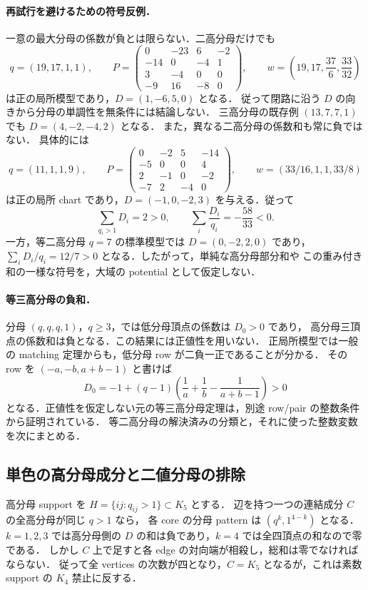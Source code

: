 \paragraph{再試行を避けるための符号反例．}
一意の最大分母の係数が負とは限らない．二高分母だけでも
\[
 q=(19,17,1,1),\qquad
 P=\begin{pmatrix}
 0&-23&6&-2\\-14&0&-4&1\\3&-4&0&0\\-9&16&-8&0
 \end{pmatrix},\qquad
 w=\left(19,17,\frac{37}{6},\frac{33}{32}\right)
\]
は正の局所模型であり，$D=(1,-6,5,0)$ となる．
従って閉路に沿う $D$ の向きから分母の単調性を無条件には結論しない．
三高分母の既存例 $(13,7,7,1)$ でも $D=(4,-2,-4,2)$ となる．
また，異なる二高分母の係数和も常に負ではない．
具体的には
\[
 q=(11,1,1,9),\qquad
 P=\begin{pmatrix}
 0&-2&5&-14\\
 -5&0&0&4\\
 2&-1&0&-2\\
 -7&2&-4&0
 \end{pmatrix},\qquad
 w=(33/16,1,1,33/8)
\]
は正の局所 chart であり，$D=(-1,0,-2,3)$ を与える．従って
\[
 \sum_{q_i>1}D_i=2>0,\qquad
 \sum_i\frac{D_i}{q_i}=-\frac{58}{33}<0.
\]
一方，等二高分母 $q=7$ の標準模型では $D=(0,-2,2,0)$ であり，
$\sum_iD_i/q_i=12/7>0$ となる．したがって，単純な高分母部分和や
この重み付き和の一様な符号を，大域の potential として仮定しない．

\paragraph{等三高分母の負和．}
分母 $(q,q,q,1)$，$q\geq3$，では低分母頂点の係数は $D_0>0$ であり，
高分母三頂点の係数和は負となる．この結果には正値性を用いない．
正局所模型では一般の matching 定理からも，低分母 row が二負一正であることが分かる．
その row を $(-a,-b,a+b-1)$ と書けば
\[
 D_0=-1+(q-1)\left(\frac1a+\frac1b-\frac1{a+b-1}\right)>0
\]
となる．正値性を仮定しない元の等三高分母定理は，別途 row/pair の整数条件から証明されている．
等二高分母の解決済みの分類と，それに使った整数変数を次にまとめる．



\subsection{単色の高分母成分と二値分母の排除}

高分母 support を $H=\{ij:q_{ij}>1\}\subset K_5$ とする．
辺を持つ一つの連結成分 $C$ の全高分母が同じ $q>1$ なら，
各 core の分母 pattern は $(q^k,1^{4-k})$ となる．
$k=1,2,3$ では高分母側の $D$ の和は負であり，$k=4$ では全四頂点の和なので零である．
しかし $C$ 上で足すと各 edge の対向端が相殺し，総和は零でなければならない．
従って全 vertices の次数が四となり，$C=K_5$ となるが，これは素数 support の
$K_4$ 禁止に反する．

